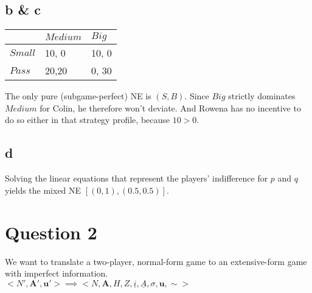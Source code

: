 \documentclass[10pt,a4paper]{article}
\begin{document}
\subsection*{b \& c}
\begin{table}[h]
\centering
\begin{tabular}[l]{|l|l|l|}
\hline
          & $Medium$ & $Big$  \\ \hline
$Small$     & 10, 0   & 10, 0 \\ \hline
$Pass$	& 20,20 & 0, 30 \\ \hline
\end{tabular}
\end{table}
The only pure (subgame-perfect) NE is $(S,B)$. Since $Big$ strictly dominates $Medium$ for Colin, he therefore won't deviate. And Rowena has no incentive to do so either in that strategy profile, because $10>0$.
\subsection*{d} 
Solving the linear equations that represent the players' indifference for $p$ and $q$ yields the mixed NE $[(0,1),(0.5,0.5)]$.
\section*{Question 2}
We want to translate a two-player, normal-form game to an extensive-form game with imperfect information.\\
$<N',\boldsymbol{A}',\boldsymbol{u}'> \implies <N,\boldsymbol{A}, H, Z, \underline{i},\underline{A},\sigma,\boldsymbol{u},\sim>$
\end{document}
